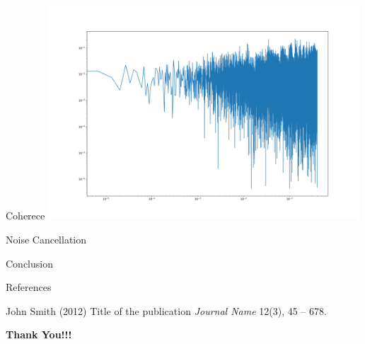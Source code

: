 \documentclass[aspectratio=169,xcolor=dvipsnames]{beamer}
\begin{document}
\begin{frame}{Coherece}
    \centering
    \includegraphics[height=8cm]{ACE_and_LPF_co-1.png}
\end{frame}
\begin{frame}{Noise Cancellation}
\end{frame}
\begin{frame}{Conclusion}
\end{frame}
\begin{frame}{References}
    \footnotesize{
        \begin{thebibliography}{99}
             John Smith (2012)
            \newblock Title of the publication
            \newblock \emph{Journal Name} 12(3), 45 -- 678.
        \end{thebibliography}
    }
\end{frame}

\begin{frame}
    \Huge{\centerline{\textbf{Thank You!!!}}}
\end{frame}
\end{document}
